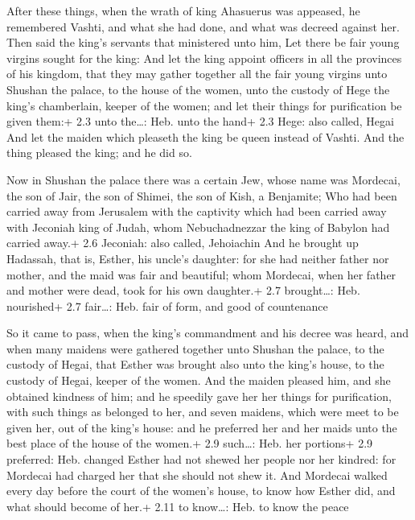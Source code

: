  After these things, when the wrath of king Ahasuerus was
appeased, he remembered Vashti, and what she had done, and what was
decreed against her.  Then said the king's servants that
ministered unto him, Let there be fair young virgins sought for the
king:  And let the king appoint officers in all the
provinces of his kingdom, that they may gather together all the fair
young virgins unto Shushan the palace, to the house of the women, unto
the custody of Hege the king's chamberlain, keeper of the women; and let
their things for purification be given them:+ 2.3 unto the\ldots: Heb.
unto the hand+ 2.3 Hege: also called, Hegai  And let the
maiden which pleaseth the king be queen instead of Vashti. And the thing
pleased the king; and he did so.

 Now in Shushan the palace there was a certain Jew, whose
name was Mordecai, the son of Jair, the son of Shimei, the son of Kish,
a Benjamite;  Who had been carried away from Jerusalem with
the captivity which had been carried away with Jeconiah king of Judah,
whom Nebuchadnezzar the king of Babylon had carried away.+ 2.6 Jeconiah:
also called, Jehoiachin  And he brought up Hadassah, that
is, Esther, his uncle's daughter: for she had neither father nor mother,
and the maid was fair and beautiful; whom Mordecai, when her father and
mother were dead, took for his own daughter.+ 2.7 brought\ldots: Heb.
nourished+ 2.7 fair\ldots: Heb. fair of form, and good of countenance

 So it came to pass, when the king's commandment and his
decree was heard, and when many maidens were gathered together unto
Shushan the palace, to the custody of Hegai, that Esther was brought
also unto the king's house, to the custody of Hegai, keeper of the
women.  And the maiden pleased him, and she obtained
kindness of him; and he speedily gave her her things for purification,
with such things as belonged to her, and seven maidens, which were meet
to be given her, out of the king's house: and he preferred her and her
maids unto the best place of the house of the women.+ 2.9 such\ldots:
Heb. her portions+ 2.9 preferred: Heb. changed  Esther had
not shewed her people nor her kindred: for Mordecai had charged her that
she should not shew it.  And Mordecai walked every day
before the court of the women's house, to know how Esther did, and what
should become of her.+ 2.11 to know\ldots: Heb. to know the peace

